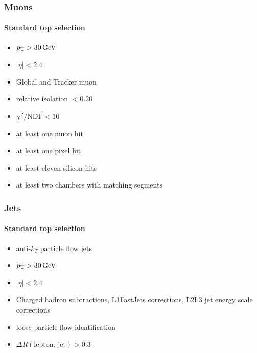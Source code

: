 \documentclass[italian]{beamer}
\begin{document}
\begin{frame}
    \frametitle{Muons}
    \framesubtitle{Standard top selection}
    \begin{itemize}
        \item $\pt > \unit[30]{GeV}$
        \item $|\eta| < 2.4$
        \item Global and Tracker muon
        \item relative isolation $< 0.20$
        \item $\chi^2/\text{NDF} < 10$
        \item at least one muon hit
        \item at least one pixel hit
        \item at least eleven silicon hits
        \item at least two chambers with matching segments
    \end{itemize}
\end{frame}

\begin{frame}
    \frametitle{Jets}
    \framesubtitle{Standard top selection}
    \begin{itemize}
        \item anti-$k_T$ particle flow jets
        \item $\pt > \unit[30]{GeV}$
        \item $|\eta| < 2.4$
        \item Charged hadron subtractions, L1FastJets corrections,
            L2L3 jet energy scale corrections
        \item loose particle flow identification
        \item $\Delta R(\text{lepton, jet}) > 0.3$
    \end{itemize}
\end{frame}
\end{document}
